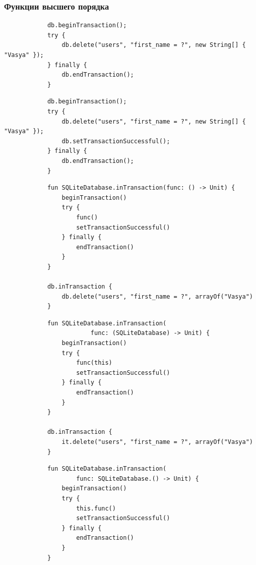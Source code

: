 \documentclass{beamer}
\begin{document}
\begin{frame}[fragile, t]
    \frametitle{Функции высшего порядка}
    \begin{overprint}
        \begin{verbatim}
            db.beginTransaction();
            try {
                db.delete("users", "first_name = ?", new String[] { "Vasya" });
            } finally {
                db.endTransaction();
            }
        \end{verbatim}

        \begin{verbatim}
            db.beginTransaction();
            try {
                db.delete("users", "first_name = ?", new String[] { "Vasya" });
                db.setTransactionSuccessful();
            } finally {
                db.endTransaction();
            }
        \end{verbatim}

        \begin{verbatim}
            fun SQLiteDatabase.inTransaction(func: () -> Unit) {
                beginTransaction()
                try {
                    func()
                    setTransactionSuccessful()
                } finally {
                    endTransaction()
                }
            }

            db.inTransaction {
                db.delete("users", "first_name = ?", arrayOf("Vasya")
            }
        \end{verbatim}

        \begin{verbatim}
            fun SQLiteDatabase.inTransaction(
                        func: (SQLiteDatabase) -> Unit) {
                beginTransaction()
                try {
                    func(this)
                    setTransactionSuccessful()
                } finally {
                    endTransaction()
                }
            }

            db.inTransaction {
                it.delete("users", "first_name = ?", arrayOf("Vasya")
            }
        \end{verbatim}

        \begin{verbatim}
            fun SQLiteDatabase.inTransaction(
                    func: SQLiteDatabase.() -> Unit) {
                beginTransaction()
                try {
                    this.func()
                    setTransactionSuccessful()
                } finally {
                    endTransaction()
                }
            }


\end{verbatim}
\end{overprint}
\end{frame}
\end{document}
